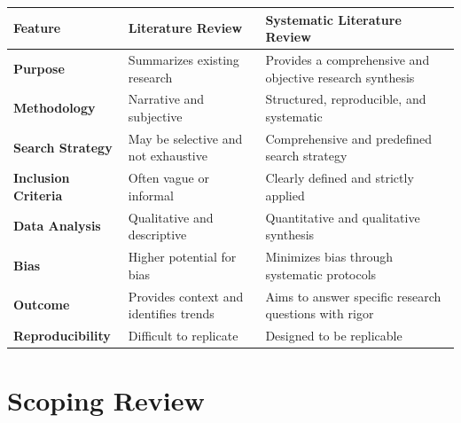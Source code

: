\documentclass[
  letterpaper,
  DIV=11,
  numbers=noendperiod]{scrreprt}
\begin{document}
\begin{longtable}[]{@{}
  >{\raggedright\arraybackslash}p{}
  >{\raggedright\arraybackslash}p{}
  >{\raggedright\arraybackslash}p{}@{}}
\toprule\noalign{}
\begin{minipage}[b]{\linewidth}\raggedright
\textbf{Feature}
\end{minipage} & \begin{minipage}[b]{\linewidth}\raggedright
\textbf{Literature Review}
\end{minipage} & \begin{minipage}[b]{\linewidth}\raggedright
\textbf{Systematic Literature Review}
\end{minipage} \\
\midrule\noalign{}
\endhead
\bottomrule\noalign{}
\endlastfoot
\textbf{Purpose} & Summarizes existing research & Provides a
comprehensive and objective research synthesis \\
\textbf{Methodology} & Narrative and subjective & Structured,
reproducible, and systematic \\
\textbf{Search Strategy} & May be selective and not exhaustive &
Comprehensive and predefined search strategy \\
\textbf{Inclusion Criteria} & Often vague or informal & Clearly defined
and strictly applied \\
\textbf{Data Analysis} & Qualitative and descriptive & Quantitative and
qualitative synthesis \\
\textbf{Bias} & Higher potential for bias & Minimizes bias through
systematic protocols \\
\textbf{Outcome} & Provides context and identifies trends & Aims to
answer specific research questions with rigor \\
\textbf{Reproducibility} & Difficult to replicate & Designed to be
replicable \\
\end{longtable}

\section*{}\label{section-1}

\markright{}

\section*{Scoping Review}\label{scoping-review}
\end{document}
